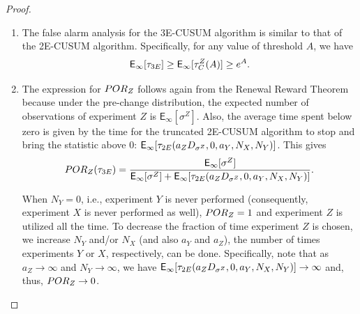 \documentclass[10pt,a4paper]{amsart}
\begin{document}
\begin{proof}
\begin{enumerate}
\item The false alarm analysis for the 3E-CUSUM algorithm is similar to that of the 2E-CUSUM algorithm. Specifically, for any value of threshold $A$, we have
$$ \mathsf{E}_\infty [\tau_{\textup{\fontsize{6 pt}{10 pt}\selectfont 3E}}] \geq \mathsf{E}_\infty [\tau_{\textup{\fontsize{6 pt}{10 pt}\selectfont C}}^Z (A)] \geq e^A. $$

\item The expression for $\textup{POR}_Z$ follows again from the Renewal Reward Theorem because under the pre-change distribution, the expected number of observations of experiment $Z$ is $\mathsf{E}_\infty [\sigma^Z]$. Also, the average time spent below zero is given by the time for the truncated 2E-CUSUM algorithm to stop and bring the statistic above $0$: $\mathsf{E}_\infty [\tau_{\textup{\fontsize{6 pt}{10 pt}\selectfont 2E}}(a_Z D_{\sigma^Z}, 0, a_Y, N_X, N_Y)]$. This gives
\begin{align*}
\textup{POR}_Z (\tau_{\textup{\fontsize{6 pt}{10 pt}\selectfont 3E}})  = \frac{\mathsf{E}_\infty [\sigma^Z]}{\mathsf{E}_\infty [\sigma^Z] + \mathsf{E}_\infty [\tau_{\textup{\fontsize{6 pt}{10 pt}\selectfont 2E}}(a_Z D_{\sigma^Z}, 0, a_Y, N_X, N_Y)]}.
\end{align*}

When $N_Y = 0$, i.e., experiment $Y$ is never performed (consequently, experiment $X$ is never performed as well), $\textup{POR}_Z = 1$ and experiment $Z$ is utilized all the time. To decrease the fraction of time experiment $Z$ is chosen, we increase $N_Y$ and/or $N_X$ (and also $a_Y$ and $a_Z$), the number of times experiments $Y$ or $X$, respectively, can be done. Specifically, note that as $a_Z \to \infty$ and $N_Y \to \infty$, we have $\mathsf{E}_\infty [\tau_{\textup{\fontsize{6 pt}{10 pt}\selectfont 2E}}(a_Z D_{\sigma^Z}, 0, a_Y, N_X, N_Y)] \to \infty$ and, thus, $\textup{POR}_Z \to 0$.

\medskip


\end{enumerate}
\end{proof}
\end{document}
